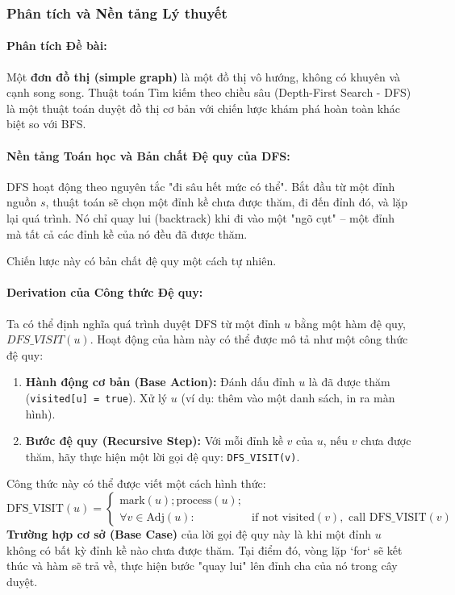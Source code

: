 \documentclass[a4paper,12pt]{article}
\begin{document}
\subsubsection{Phân tích và Nền tảng Lý thuyết}
\paragraph{Phân tích Đề bài:}
Một \textbf{đơn đồ thị (simple graph)} là một đồ thị vô hướng, không có khuyên và cạnh song song. Thuật toán Tìm kiếm theo chiều sâu (Depth-First Search - DFS) là một thuật toán duyệt đồ thị cơ bản với chiến lược khám phá hoàn toàn khác biệt so với BFS.

\paragraph{Nền tảng Toán học và Bản chất Đệ quy của DFS:}
DFS hoạt động theo nguyên tắc "đi sâu hết mức có thể". Bắt đầu từ một đỉnh nguồn $s$, thuật toán sẽ chọn một đỉnh kề chưa được thăm, đi đến đỉnh đó, và lặp lại quá trình. Nó chỉ quay lui (backtrack) khi đi vào một "ngõ cụt" -- một đỉnh mà tất cả các đỉnh kề của nó đều đã được thăm.

Chiến lược này có bản chất đệ quy một cách tự nhiên.

\paragraph{Derivation của Công thức Đệ quy:}
Ta có thể định nghĩa quá trình duyệt DFS từ một đỉnh $u$ bằng một hàm đệ quy, $DFS\_VISIT(u)$. Hoạt động của hàm này có thể được mô tả như một công thức đệ quy:
\begin{enumerate}
    \item \textbf{Hành động cơ bản (Base Action):} Đánh dấu đỉnh $u$ là đã được thăm (\texttt{visited[u] = true}). Xử lý $u$ (ví dụ: thêm vào một danh sách, in ra màn hình).
    \item \textbf{Bước đệ quy (Recursive Step):} Với mỗi đỉnh kề $v$ của $u$, nếu $v$ chưa được thăm, hãy thực hiện một lời gọi đệ quy: \texttt{DFS\_VISIT(v)}.
\end{enumerate}
Công thức này có thể được viết một cách hình thức:
\[ \text{DFS\_VISIT}(u) = \left\{ \begin{array}{ll}
    \text{mark}(u); \text{process}(u); & \\
    \forall v \in \text{Adj}(u): & \text{if not visited}(v), \text{ call } \text{DFS\_VISIT}(v)
\end{array} \right. \]
\textbf{Trường hợp cơ sở (Base Case)} của lời gọi đệ quy này là khi một đỉnh $u$ không có bất kỳ đỉnh kề nào chưa được thăm. Tại điểm đó, vòng lặp `for` sẽ kết thúc và hàm sẽ trả về, thực hiện bước "quay lui" lên đỉnh cha của nó trong cây duyệt.
\end{document}
